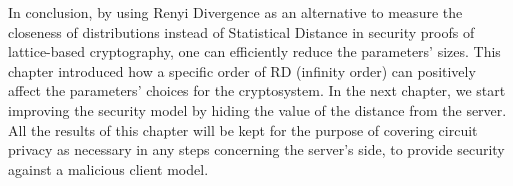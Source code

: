 In conclusion, by using Renyi Divergence as an alternative to measure the
closeness of distributions instead of Statistical Distance in security proofs
of lattice-based cryptography, one can efficiently reduce the parameters'
sizes. This chapter introduced how a specific order of RD (infinity order) can
positively affect the parameters' choices for the cryptosystem. In the next
chapter, we start improving the security model by hiding the value of the
distance from the server. All the results of this chapter will be kept for the
purpose of covering circuit privacy as necessary in any steps concerning the server's
side, to provide security against a malicious client model.


    

